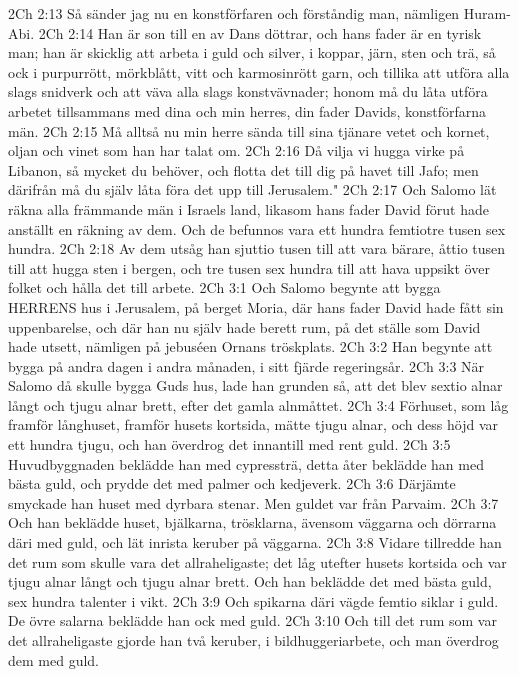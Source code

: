 2Ch 2:13  Så sänder jag nu en konstförfaren och förståndig man, nämligen Huram-Abi.
2Ch 2:14  Han är son till en av Dans döttrar, och hans fader är en tyrisk man; han är skicklig att arbeta i guld och silver, i koppar, järn, sten och trä, så ock i purpurrött, mörkblått, vitt och karmosinrött garn, och tillika att utföra alla slags snidverk och att väva alla slags konstvävnader; honom må du låta utföra arbetet tillsammans med dina och min herres, din fader Davids, konstförfarna män.
2Ch 2:15  Må alltså nu min herre sända till sina tjänare vetet och kornet, oljan och vinet som han har talat om.
2Ch 2:16  Då vilja vi hugga virke på Libanon, så mycket du behöver, och flotta det till dig på havet till Jafo; men därifrån må du själv låta föra det upp till Jerusalem."
2Ch 2:17  Och Salomo lät räkna alla främmande män i Israels land, likasom hans fader David förut hade anställt en räkning av dem. Och de befunnos vara ett hundra femtiotre tusen sex hundra.
2Ch 2:18  Av dem utsåg han sjuttio tusen till att vara bärare, åttio tusen till att hugga sten i bergen, och tre tusen sex hundra till att hava uppsikt över folket och hålla det till arbete.
2Ch 3:1  Och Salomo begynte att bygga HERRENS hus i Jerusalem, på berget Moria, där hans fader David hade fått sin uppenbarelse, och där han nu själv hade berett rum, på det ställe som David hade utsett, nämligen på jebuséen Ornans tröskplats.
2Ch 3:2  Han begynte att bygga på andra dagen i andra månaden, i sitt fjärde regeringsår.
2Ch 3:3  När Salomo då skulle bygga Guds hus, lade han grunden så, att det blev sextio alnar långt och tjugu alnar brett, efter det gamla alnmåttet.
2Ch 3:4  Förhuset, som låg framför långhuset, framför husets kortsida, mätte tjugu alnar, och dess höjd var ett hundra tjugu, och han överdrog det innantill med rent guld.
2Ch 3:5  Huvudbyggnaden beklädde han med cypressträ, detta åter beklädde han med bästa guld, och prydde det med palmer och kedjeverk.
2Ch 3:6  Därjämte smyckade han huset med dyrbara stenar. Men guldet var från Parvaim.
2Ch 3:7  Och han beklädde huset, bjälkarna, trösklarna, ävensom väggarna och dörrarna däri med guld, och lät inrista keruber på väggarna.
2Ch 3:8  Vidare tillredde han det rum som skulle vara det allraheligaste; det låg utefter husets kortsida och var tjugu alnar långt och tjugu alnar brett. Och han beklädde det med bästa guld, sex hundra talenter i vikt.
2Ch 3:9  Och spikarna däri vägde femtio siklar i guld. De övre salarna beklädde han ock med guld.
2Ch 3:10  Och till det rum som var det allraheligaste gjorde han två keruber, i bildhuggeriarbete, och man överdrog dem med guld.

